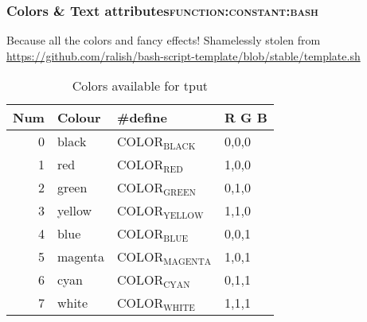 \documentclass[11pt]{article}
\begin{document}
\subsubsection{Colors \& Text attributes\hfill{}\textsc{function:constant:bash}}
\label{sec:orgd85065a}

Because all the colors and fancy effects! Shamelessly stolen from \url{https://github.com/ralish/bash-script-template/blob/stable/template.sh} 

\begin{table}[htbp]
\caption{Colors available for tput}
\centering
\begin{tabular}{rlll}
\hline
Num & Colour & \#define & R G B\\
\hline
0 & black & COLOR\(_{\text{BLACK}}\) & 0,0,0\\
1 & red & COLOR\(_{\text{RED}}\) & 1,0,0\\
2 & green & COLOR\(_{\text{GREEN}}\) & 0,1,0\\
3 & yellow & COLOR\(_{\text{YELLOW}}\) & 1,1,0\\
4 & blue & COLOR\(_{\text{BLUE}}\) & 0,0,1\\
5 & magenta & COLOR\(_{\text{MAGENTA}}\) & 1,0,1\\
6 & cyan & COLOR\(_{\text{CYAN}}\) & 0,1,1\\
7 & white & COLOR\(_{\text{WHITE}}\) & 1,1,1\\
\hline
\end{tabular}
\end{table}
\end{document}
